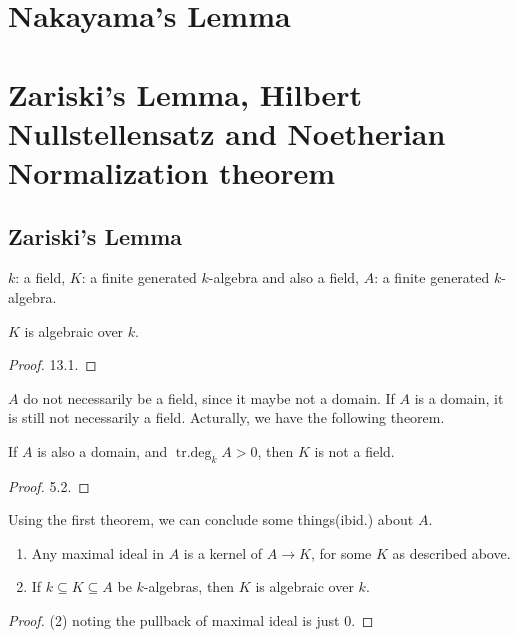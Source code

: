 \section{Nakayama's Lemma}

\section{Zariski's Lemma, Hilbert Nullstellensatz and Noetherian Normalization theorem}

\subsection{Zariski's Lemma}
\( k \): a field, \( K \): a finite generated \( k \)-algebra and also a field, \( A \): a finite generated \( k \)-algebra.
\begin{theorem}[Zariski]
  \( K \) is algebraic over \( k \).
\end{theorem}
\begin{proof}
  \cite{milneCA} 13.1.
\end{proof}

\( A \) do not necessarily be a field, since it maybe not a domain.
If \( A \) is a domain, it is still not necessarily a field.
Acturally, we have the following theorem.

\begin{theorem}
  If \( A \) is also a domain, and \( \operatorname{tr.deg}_k A > 0 \), then \( K \) is not a field.
\end{theorem}
\begin{proof}
  \cite{Matsumura1989-ab} 5.2.
\end{proof}

Using the first theorem, we can conclude some things(ibid.) about \( A \).

\begin{corollary}
  \begin{enumerate}
    \item Any maximal ideal in \( A \) is a kernel of \( A \to K \), for some \( K \) as described above.
    \item If \( k \subseteq K \subseteq A \) be \( k \)-algebras, then \( K \) is algebraic over \( k \).
  \end{enumerate}
\end{corollary}
\begin{proof}
  (2) noting the pullback of maximal ideal is just \( 0 \).
\end{proof}

